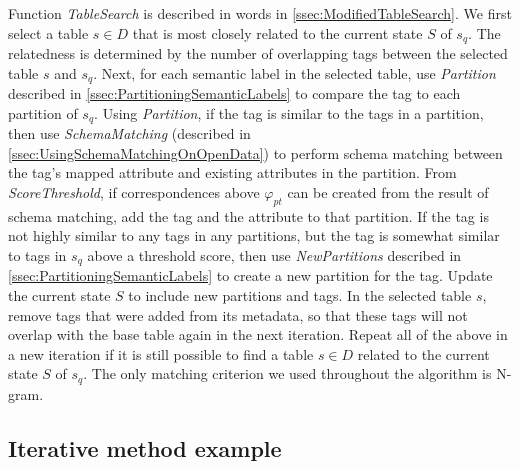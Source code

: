 Function \textit{TableSearch} is described in words in \autoref{ssec:ModifiedTableSearch}. We first select a table $s\in D$ that is most closely related to the current state $S$ of $s_q$. The relatedness is determined by the number of overlapping tags between the selected table $s$ and $s_q$. Next, for each semantic label in the selected table, use \textit{Partition} described in \autoref{ssec:PartitioningSemanticLabels} to compare the tag to each partition of $s_q$. Using \textit{Partition}, if the tag is similar to the tags in a partition, then use \textit{SchemaMatching} (described in \autoref{ssec:UsingSchemaMatchingOnOpenData}) to perform schema matching between the tag's mapped attribute and existing attributes in the partition. From \textit{ScoreThreshold}, if correspondences above $\ensuremath{\varphi}_{pt}$ can be created from the result of schema matching, add the tag and the attribute to that partition. If the tag is not highly similar to any tags in any partitions, but the tag is somewhat similar to tags in $s_q$ above a threshold score, then use \textit{NewPartitions} described in \autoref{ssec:PartitioningSemanticLabels} to create a new partition for the tag. Update the current state $S$ to include new partitions and tags. In the selected table $s$, remove tags that were added from its metadata, so that these tags will not overlap with the base table again in the next iteration. Repeat all of the above in a new iteration if it is still possible to find a table $s\in D$ related to the current state $S$ of $s_q$. The only matching criterion we used throughout the algorithm is N-gram.

\subsection{Iterative method example}
\label{ssec:IterativeMethodExample}

